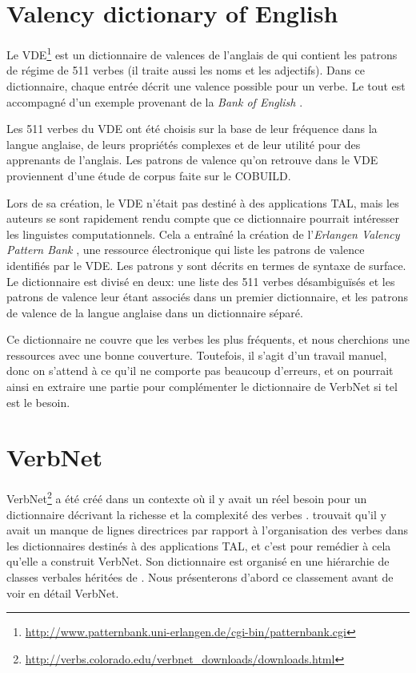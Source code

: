 \section{Valency dictionary of English}
Le \acf{VDE}\footnote{\url{http://www.patternbank.uni-erlangen.de/cgi-bin/patternbank.cgi}} est un dictionnaire de valences de l'anglais de \cite{HerbstValencyDictionaryEnglish2004} qui contient les patrons de régime de 511 verbes (il traite aussi les noms et les adjectifs). Dans ce dictionnaire, chaque entrée décrit une valence possible pour un verbe. Le tout est accompagné d'un exemple provenant de la \emph{Bank of English} \citep{JarvinenAnnotating200Million1994}.

Les 511 verbes du VDE ont été choisis sur la base de leur fréquence dans la langue anglaise, de leurs propriétés complexes et de leur utilité pour des apprenants de l'anglais. Les patrons de valence qu'on retrouve dans le VDE proviennent d'une étude de corpus faite sur le COBUILD. 

Lors de sa création, le VDE n'était pas destiné à des applications TAL, mais les auteurs se sont rapidement rendu compte que ce dictionnaire pourrait intéresser les linguistes computationnels. Cela a entraîné la création de l'\emph{Erlangen Valency Pattern Bank} \citep{faucris.1039365}, une ressource électronique qui liste les patrons de valence identifiés par le VDE. Les patrons y sont décrits en termes de syntaxe de surface. Le dictionnaire est divisé en deux: une liste des 511 verbes désambiguïsés et les patrons de valence leur étant associés dans un premier dictionnaire, et les patrons de valence de la langue anglaise dans un dictionnaire séparé.

Ce dictionnaire ne couvre que les verbes les plus fréquents, et nous cherchions une ressources avec une bonne couverture. Toutefois, il s'agit d'un travail manuel, donc on s'attend à ce qu'il ne comporte pas beaucoup d'erreurs, et on pourrait ainsi en extraire une partie pour complémenter le dictionnaire de VerbNet si tel est le besoin.



\section{VerbNet}

VerbNet\footnote{\url{http://verbs.colorado.edu/verbnet_downloads/downloads.html}} a été créé dans un contexte où il y avait un réel besoin pour un dictionnaire décrivant la richesse et la complexité des verbes \citep{KipperClassBasedConstructionVerb2000}. \cite{SchulerVerbnetBroadcoverageComprehensive2005} trouvait qu'il y avait un manque de lignes directrices par rapport à l'organisation des verbes dans les dictionnaires destinés à des applications \ac{TAL}, et c'est pour remédier à cela qu'elle a construit VerbNet. Son dictionnaire est organisé en une hiérarchie de classes verbales héritées de \cite{verb-classes.levin.1993}. Nous présenterons d'abord ce classement avant de voir en détail VerbNet.


